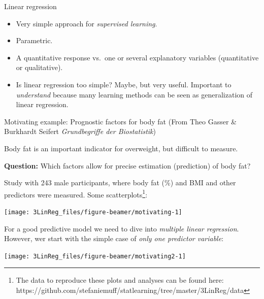 \documentclass[
  10pt,
  ignorenonframetext,
]{beamer}
\begin{document}
\begin{frame}{Linear regression}
\protect\hypertarget{linear-regression}{}
\begin{itemize}
\item
  Very simple approach for \emph{supervised learning}.
\item
  Parametric.
\item
  A quantitative response vs.~one or several explanatory variables
  (quantitative or qualitative).
\item
  Is linear regression too simple? Maybe, but very useful. Important to
  \emph{understand} because many learning methods can be seen as
  generalization of linear regression.
\end{itemize}
\end{frame}

\begin{frame}
\begin{block}{Motivating example: Prognostic factors for body fat}
\protect\hypertarget{motivating-example-prognostic-factors-for-body-fat}{}
\tiny(From Theo Gasser \& Burkhardt Seifert \emph{Grundbegriffe der
Biostatistik})

\vspace{2mm}
\normalsize

Body fat is an important indicator for overweight, but difficult to
measure.

\vspace{2mm}

\textbf{Question:} Which factors allow for precise estimation
(prediction) of body fat?

\vspace{2mm}

Study with 243 male participants, where body fat (\%) and BMI and other
predictors were measured. Some
scatterplots\footnote{The data to reproduce these plots and analyses can be found here: https://github.com/stefaniemuff/statlearning/tree/master/3LinReg/data}:

\begin{center}\texttt{[image: 3LinReg\_files/figure-beamer/motivating-1]} \end{center}
\end{block}
\end{frame}

\begin{frame}
For a good predictive model we need to dive into \emph{multiple linear
regression}. However, wer start with the simple case of \emph{only one
predictor variable}:

\begin{center}\texttt{[image: 3LinReg\_files/figure-beamer/motivating2-1]} \end{center}
\end{frame}
\end{document}

